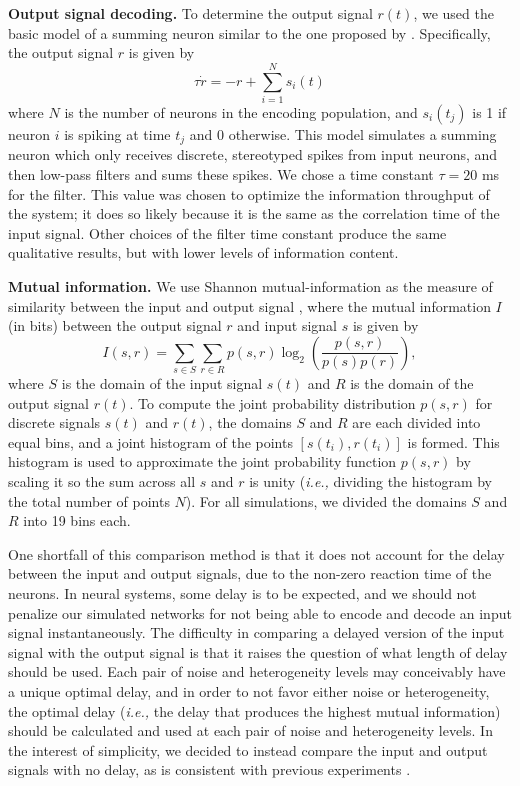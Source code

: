 \documentclass[12pt]{article}
\begin{document}
\textbf{Output signal decoding.} To determine the output signal $r(t)$, we used the basic model of a summing neuron similar to the one proposed by \cite{Stocks2001}. Specifically, the output signal $r$ is given by
\begin{equation}
  \tau \dot{r} = -r + \sum\limits_{i=1}^N s_i(t)
\end{equation}
where $N$ is the number of neurons in the encoding population, and $s_i(t_j)$ is 1 if neuron $i$ is spiking at time $t_j$ and 0 otherwise. This model simulates a summing neuron which only receives discrete, stereotyped spikes from input neurons, and then low-pass filters and sums these spikes.
We chose a time constant $\tau = 20$ ms for the filter. This value was chosen to optimize the information throughput of the system; it does so likely because it is the same as the correlation time of the input signal. Other choices of the filter time constant produce the same qualitative results, but with lower levels of information content.


\textbf{Mutual information.} We use Shannon mutual-information as the measure of similarity between the input and output signal \citep{Heneghan1996,Stocks2001}, where the mutual information $I$ (in bits) between the output signal $r$ and input signal $s$ is given by
\begin{equation}
  I(s,r) = \sum\limits_{s \in S} \sum\limits_{r \in R} p(s,r) \log_2\left(\frac{p(s,r)}{p(s)p(r)}\right),
\end{equation}
where $S$ is the domain of the input signal $s(t)$ and $R$ is the domain of the output signal $r(t)$. To compute the joint probability distribution $p(s,r)$ for discrete signals $s(t)$ and $r(t)$, the domains $S$ and $R$ are each divided into equal bins, and a joint histogram of the points $[s(t_i),r(t_i)]$ is formed. This histogram is used to approximate the joint probability function $p(s,r)$ by scaling it so the sum across all $s$ and $r$ is unity (\emph{i.e.,} dividing the histogram by the total number of points $N$). For all simulations, we divided the domains $S$ and $R$ into 19 bins each.

One shortfall of this comparison method is that it does not account for the delay between the input and output signals, due to the non-zero reaction time of the neurons. In neural systems, some delay is to be expected, and we should not penalize our simulated networks for not being able to encode and decode an input signal instantaneously. The difficulty in comparing a delayed version of the input signal with the output signal is that it raises the question of what length of delay should be used. Each pair of noise and heterogeneity levels may conceivably have a unique optimal delay, and in order to not favor either noise or heterogeneity, the optimal delay (\emph{i.e.,} the delay that produces the highest mutual information) should be calculated and used at each pair of noise and heterogeneity levels. In the interest of simplicity, we decided to instead compare the input and output signals with no delay, as is consistent with previous experiments \citep{Stocks2001}.
\end{document}

